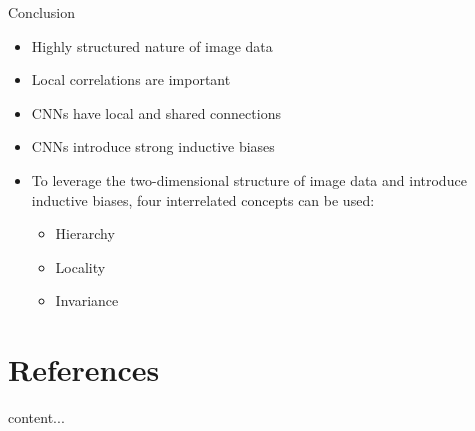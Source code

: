 \documentclass[default, aspectratio=169]{beamer}
\begin{document}
	
	\begin{frame}{Conclusion}
		
		\begin{itemize}
			\item Highly structured nature of image data
			\item Local correlations are important
			\item CNNs have local and shared connections
			\item CNNs introduce strong inductive biases
			\item To leverage the two-dimensional structure of image data and introduce inductive biases, four interrelated concepts can be used:
			\begin{itemize}
				\item Hierarchy
				\item Locality
				\item Invariance 
			\end{itemize}
		\end{itemize}
		
	\end{frame}
	
	\section{References}
	\begin{frame}
		content...
	\end{frame}
	
	
	
\end{document}
